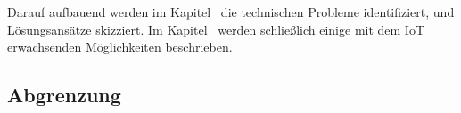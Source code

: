Darauf aufbauend werden im Kapitel~ die technischen Probleme identifiziert, und Lösungsansätze skizziert. Im Kapitel~ werden schließlich einige mit dem IoT erwachsenden Möglichkeiten beschrieben. 


\subsection{Abgrenzung}



